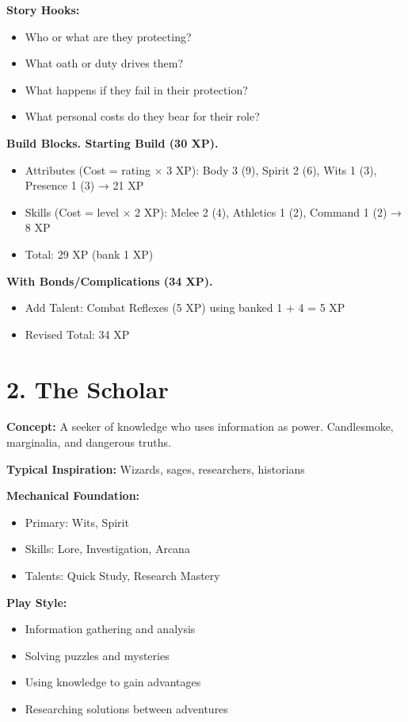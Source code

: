 \documentclass[11pt,twoside,openany]{book}
\begin{document}
\textbf{Story Hooks:}
\begin{itemize}
\item Who or what are they protecting?
\item What oath or duty drives them?
\item What happens if they fail in their protection?
\item What personal costs do they bear for their role?
\end{itemize}

\textbf{Build Blocks. Starting Build (30 XP).}
\begin{itemize}
\item Attributes (Cost = rating × 3 XP): Body 3 (9), Spirit 2 (6), Wits 1 (3), Presence 1 (3) → 21 XP
\item Skills (Cost = level × 2 XP): Melee 2 (4), Athletics 1 (2), Command 1 (2) → 8 XP
\item Total: 29 XP (bank 1 XP)
\end{itemize}

\textbf{With Bonds/Complications (34 XP).}
\begin{itemize}
\item Add Talent: Combat Reflexes (5 XP) using banked 1 + 4 = 5 XP
\item Revised Total: 34 XP
\end{itemize}

\section*{2. The Scholar} 

\textbf{Concept:} A seeker of knowledge who uses information as power. Candlesmoke, marginalia, and dangerous truths.

\textbf{Typical Inspiration:} Wizards, sages, researchers, historians

\textbf{Mechanical Foundation:}
\begin{itemize}
\item Primary: Wits, Spirit
\item Skills: Lore, Investigation, Arcana
\item Talents: Quick Study, Research Mastery
\end{itemize}

\textbf{Play Style:}
\begin{itemize}
\item Information gathering and analysis
\item Solving puzzles and mysteries
\item Using knowledge to gain advantages
\item Researching solutions between adventures
\end{itemize}
\end{document}
